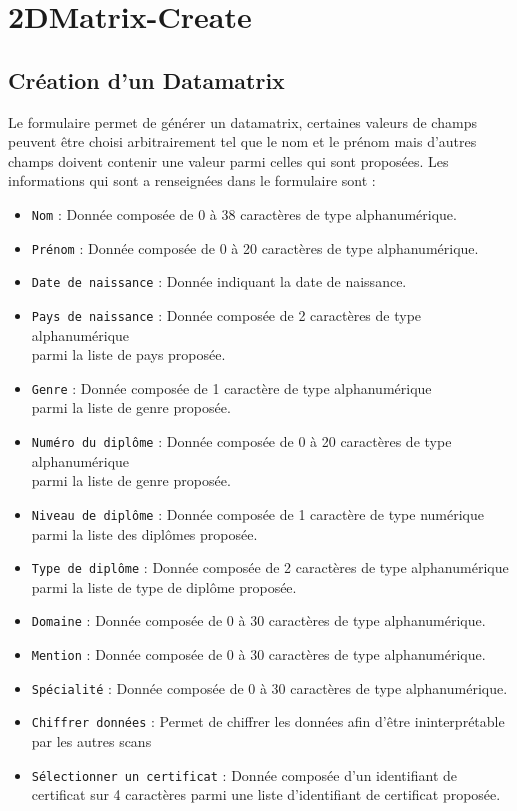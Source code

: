 \section{2DMatrix-Create}\label{create}

\subsection{Création d'un Datamatrix}
Le formulaire permet de générer un datamatrix, certaines valeurs de champs peuvent être choisi arbitrairement tel que le nom et le prénom mais d'autres champs doivent contenir une valeur parmi celles qui sont proposées. Les informations qui sont a renseignées dans le formulaire sont : 

\begin{itemize}
    \item \texttt{Nom} : Donnée composée de 0 à 38 caractères de type alphanumérique.
    \item \texttt{Prénom} : Donnée composée de 0 à 20 caractères de type alphanumérique.
    \item \texttt{Date de naissance} : Donnée indiquant la date de naissance.
    \item \texttt{Pays de naissance} : Donnée composée de 2 caractères de type alphanumérique 
    \\parmi la liste de pays proposée.
    \item \texttt{Genre} : Donnée composée de 1 caractère de type alphanumérique 
    \\parmi la liste de genre proposée.
    \item \texttt{Numéro du diplôme} : Donnée composée de 0 à 20 caractères de type alphanumérique
    \\parmi la liste de genre proposée. 
    \item \texttt{Niveau de diplôme} : Donnée composée de 1 caractère de type numérique
    \\parmi la liste des diplômes proposée.
    \item \texttt{Type de diplôme} : Donnée composée de 2 caractères de type alphanumérique
    \\parmi la liste de type de diplôme proposée. 
    \item \texttt{Domaine} : Donnée composée de 0 à 30 caractères de type alphanumérique.
    \item \texttt{Mention} : Donnée composée de 0 à 30 caractères de type alphanumérique.
    \item \texttt{Spécialité} : Donnée composée de 0 à 30 caractères de type alphanumérique.
    \item \texttt{Chiffrer données} : Permet de chiffrer les données afin d'être ininterprétable par les autres scans
    \item \texttt{Sélectionner un certificat} : Donnée composée d'un identifiant de certificat sur 4 caractères parmi une liste
    d'identifiant de certificat proposée.
\end{itemize}

